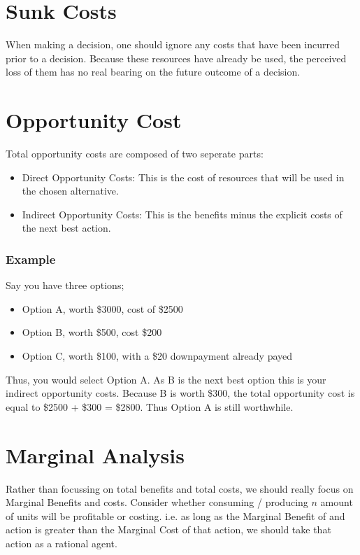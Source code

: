 \documentclass[12pt]{report}
\begin{document}
\begin{flushleft}
\section*{Sunk Costs}
When making a decision, one should ignore any costs that have been incurred prior to a decision.
Because these resources have already be used, the perceived loss of them has no real bearing on 
the future outcome of a decision.

\section*{Opportunity Cost}
Total opportunity costs are composed of two seperate parts:
\begin{itemize}
    \item Direct Opportunity Costs: This is the cost of resources that will be used in the chosen alternative.
    \item Indirect Opportunity Costs: This is the benefits minus the explicit costs of the next best action.
\end{itemize}

\subsubsection*{Example}
Say you have three options;
\begin{itemize}
    \item Option A, worth \$3000, cost of \$2500
    \item Option B, worth \$500, cost \$200
    \item Option C, worth \$100, with a \$20 downpayment already payed
\end{itemize}
Thus, you would select Option A. As B is the next best option
this is your indirect opportunity costs. Because B is worth \$300, the total opportunity cost is equal
to \$2500 + \$300 = \$2800. Thus Option A is still worthwhile.

\section*{Marginal Analysis}
Rather than focussing on total benefits and total costs, we should really focus on Marginal Benefits
and costs. Consider whether consuming / producing \(n\) amount of units will be profitable or costing.
i.e. as long as the Marginal Benefit of and action is greater than the Marginal Cost of that action,
we should take that action as a rational agent.


\end{flushleft}
\end{document}
